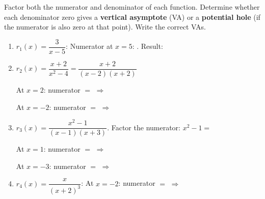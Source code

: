 \documentclass[10pt]{article}
\begin{document}
\vspace{0.1in}

\begin{tcolorbox}[colback=white, colframe=black!40,
    title=\textbf{Tier A --- Apply},
    fonttitle=\bfseries, arc=2mm, left=3mm, right=3mm, top=2mm, bottom=2mm]

Factor both the numerator and denominator of each function. Determine whether each denominator
zero gives a \textbf{vertical asymptote} (VA) or a \textbf{potential hole} (if the numerator
is also zero at that point). Write the correct VAs.

\begin{enumerate}[itemsep=12pt]
  \item $r_1(x) = \dfrac{3}{x - 5}$: \quad
        Numerator at $x=5$: \blank{2cm}. \quad Result: \blank{4cm}

  \item $r_2(x) = \dfrac{x + 2}{x^2 - 4} = \dfrac{x+2}{(x-2)(x+2)}$

        At $x = 2$: numerator $=$ \blank{1.5cm} \quad $\Rightarrow$ \blank{4cm}

        At $x = -2$: numerator $=$ \blank{1.5cm} \quad $\Rightarrow$ \blank{4cm}

  \item $r_3(x) = \dfrac{x^2-1}{(x-1)(x+3)}$.
        Factor the numerator: $x^2 - 1 =$ \blank{4cm}

        At $x = 1$: numerator $=$ \blank{1.5cm} \quad $\Rightarrow$ \blank{4cm}

        At $x = -3$: numerator $=$ \blank{1.5cm} \quad $\Rightarrow$ \blank{4cm}

  \item $r_4(x) = \dfrac{x}{(x+2)^3}$: \quad
        At $x = -2$: numerator $=$ \blank{1.5cm} \quad $\Rightarrow$ \blank{4cm}
\end{enumerate}
\end{tcolorbox}

\vspace{0.1in}
\end{document}
